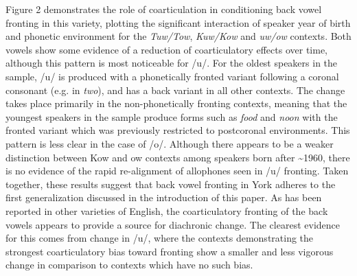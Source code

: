 \documentclass[12pt]{article}
\begin{document}
Figure 2 demonstrates the role of coarticulation in conditioning back vowel fronting in this variety, plotting the significant interaction of speaker year of birth and phonetic environment for the \textit{Tuw/Tow}, \textit{Kuw/Kow} and \textit{uw/ow} contexts. Both vowels show some evidence of a reduction of coarticulatory effects over time, although this pattern is most noticeable for /u/. For the oldest speakers in the sample, /u/ is produced with a phonetically fronted variant following a coronal consonant (e.g. in \textit{two}), and has a back variant in all other contexts. The change takes place primarily in the non-phonetically fronting contexts, meaning that the youngest speakers in the sample produce forms such as \textit{food} and \textit{noon} with the fronted variant which was previously restricted to postcoronal environments. This pattern is less clear in the case of /o/. Although there appears to be a weaker distinction between Kow and ow contexts among speakers born after \textasciitilde1960, there is no evidence of the rapid re-alignment of allophones seen in /u/ fronting. Taken together, these results suggest that back vowel fronting in York adheres to the first generalization discussed in the introduction of this paper. As has been reported in other varieties of English, the coarticulatory fronting of the back vowels appears to provide a source for diachronic change. The clearest evidence for this comes from change in /u/, where the contexts demonstrating the strongest coarticulatory bias toward fronting show a smaller and less vigorous change in comparison to contexts which have no such bias. 
\end{document}
